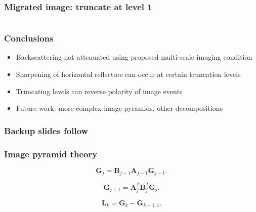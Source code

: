 \begin{frame} \frametitle{Migrated image: truncate at level 1 }
  \begin{columns}[t]
    \vspace{-0.15in}
  \end{columns}
\end{frame}



\begin{frame} \frametitle{Conclusions}
\begin{itemize}
\item Backscattering not attenuated using proposed multi-scale imaging condition
\item Sharpening of horizontal reflectors can occur at certain truncation levels
\item Truncating levels can reverse polarity of image events 
\item Future work: more complex image pyramids, other decompositions 
\end{itemize}
\end{frame}

\begin{frame} \frametitle{Backup slides follow}
\end{frame} 

\begin{frame} \frametitle{Image pyramid theory}

  \begin{equation} \label{eqn:pyrup}
  \mathbf{G}_j=\mathbf{B}_{j-1}\mathbf{A}_{j-1}\mathbf{G}_{j-1}.
  \end{equation}

  \begin{equation} \label{eqn:pyrdown} 
  \mathbf{G}_{j+1}=\mathbf{A}^T_{j}\mathbf{B}^T_{j}\mathbf{G}_{j}.
  \end{equation}

  \begin{equation} \label{eqn:residual}
  \mathbf{L}_k = \mathbf{G}_k-\mathbf{G}_{k+1,1}.
  \end{equation}

\end{frame}
